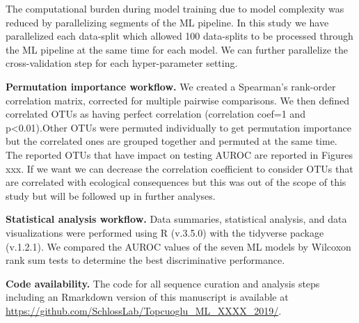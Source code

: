 \documentclass[11pt,]{article}
\begin{document}
The computational burden during model training due to model complexity
was reduced by parallelizing segments of the ML pipeline. In this study
we have parallelized each data-split which allowed 100 data-splits to be
processed through the ML pipeline at the same time for each model. We
can further parallelize the cross-validation step for each
hyper-parameter setting.

\textbf{Permutation importance workflow.} We created a Spearman's
rank-order correlation matrix, corrected for multiple pairwise
comparisons. We then defined correlated OTUs as having perfect
correlation (correlation coef=1 and p\textless{}0.01).Other OTUs were
permuted individually to get permutation importance but the correlated
ones are grouped together and permuted at the same time. The reported
OTUs that have impact on testing AUROC are reported in Figures xxx. If
we want we can decrease the correlation coefficient to consider OTUs
that are correlated with ecological consequences but this was out of the
scope of this study but will be followed up in further analyses.

\textbf{Statistical analysis workflow.} Data summaries, statistical
analysis, and data visualizations were performed using R (v.3.5.0) with
the tidyverse package (v.1.2.1). We compared the AUROC values of the
seven ML models by Wilcoxon rank sum tests to determine the best
discriminative performance.

\textbf{Code availability.} The code for all sequence curation and
analysis steps including an Rmarkdown version of this manuscript is
available at
\url{https://github.com/SchlossLab/Topcuoglu_ML_XXXX_2019/}.

\newpage
\end{document}
